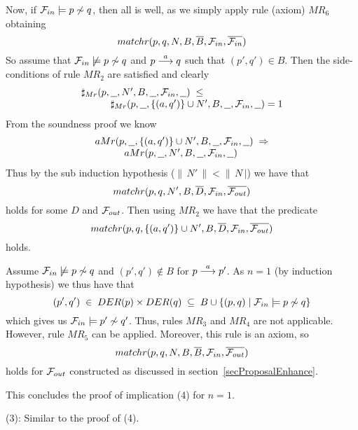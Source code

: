 \begin{theorem}
\begin{trivlist}
\noindent
Now, if ${\cal F}_{in}\models p\not\sim q$, then all is well, as we simply apply rule (axiom) $MR_6$ obtaining
\[
matchr(p,q,N,B,\overline{B},{\cal F}_{in},\overline{{\cal F}_{in}})
\]
So assume that ${\cal F}_{in}\not\models p\not\sim q$ and $p\stackrel{a}{\longrightarrow}q$ such that $(p',q')\in B$. Then the side-conditions of rule $MR_2$ are satisfied and clearly
\[
\begin{array}{llll}
\multicolumn{4}{l}{\sharp_{Mr}(p,\underline{\ \ },N',B,\underline{\ \ },{\cal F}_{in},\underline{\ \ })\;\leq}\\
&&&\sharp_{Mr}(p,\underline{\ \ },\{(a,q')\}\cup N',B,\underline{\ \ },{\cal F}_{in},\underline{\ \ }) = 1
\end{array}
\]
From the soundness proof we know
\[
\begin{array}{llll}
\multicolumn{4}{l}{aMr(p,\underline{\ \ },\{(a,q')\}\cup N',B,\underline{\ \ },{\cal F}_{in},\underline{\ \ })\;\Rightarrow}\\
&&& aMr(p,\underline{\ \ },N',B,\underline{\ \ },{\cal F}_{in},\underline{\ \ })
\end{array}
\]
Thus by the sub induction hypothesis ($\|\,N'\,\|<\|\,N\,|$) we have that
\[
matchr(p,q,N',B,\overline{D},{\cal F}_{in},\overline{{\cal F}_{out}})
\]
holds for some $D$ and ${\cal F}_{out}$. Then using $MR_2$ we have that the predicate
\[
matchr(p,q,\{(a,q')\}\cup N',B,\overline{D},{\cal F}_{in},\overline{{\cal F}_{out}})
\]
holds.

\noindent
Assume ${\cal F}_{in}\not\models p\not\sim q$ and $(p',q')\not\in B$ for $p\stackrel{a}{\longrightarrow}p'$. As $n=1$ (by induction hypothesis) we thus have that
\[
(p',q')\;\in\; DER(p)\times DER(q)\;\subseteq\; B\cup\{(p,q)\mid{\cal F}_{in}\models p\not\sim q\}
\]
which gives us ${\cal F}_{in}\models p'\not\sim q'$. Thus, rules $MR_3$ and $MR_4$ are not applicable. However, rule $MR_5$ can be applied. Moreover, this rule is an axiom, so
\[
matchr(p,q,N,B,\overline{B},{\cal F}_{in},\overline{{\cal F}_{out}})
\]
holds for ${\cal F}_{out}$ constructed as discussed in section~\ref{secProposalEnhance}.

\noindent
This concludes the proof of implication (4) for $n=1$.

\item[\rm (3):] Similar to the proof of (4).


\end{trivlist}
\end{theorem}
